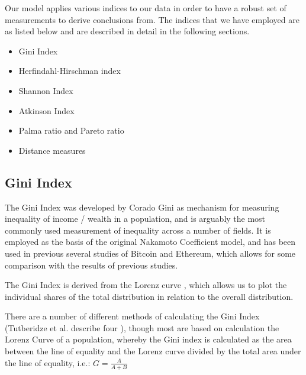 \documentclass[conference]{IEEEtran}
\begin{document}
Our model applies various indices to our data in order to have a robust set of measurements to derive conclusions from.  The indices that we have employed are as listed below and are described in detail in the following sections.

\begin{itemize}
    \item Gini Index
    \item Herfindahl-Hirschman index
    \item Shannon Index
    \item Atkinson Index
    \item Palma ratio and Pareto ratio
    \item Distance measures
\end{itemize}

\subsection{Gini Index}

The Gini Index was developed by Corado Gini \cite{gini1936measure} as mechanism for measuring inequality of income / wealth in a population, and is arguably the most commonly used measurement of inequality across a number of fields.   It is employed as the basis of the original Nakamoto Coefficient model, and has been used in previous \cite{sai2021characterizing, lee2021dq, gupta2018gini, kusmierz2022centralized, kwon2019impossibility, cong2023inclusion, gochhayat2020measuring, karakostas2022sok, zhang2022sok, campajola2022evolution} several studies of Bitcoin and Ethereum, which allows for some comparison with the results of previous studies.

The Gini Index is derived from the Lorenz curve \cite{lorenz1905methods}, which allows us to plot the individual shares of the total distribution in relation to the overall distribution.

There are a number of different methods of calculating the Gini Index (Tutberidze et al. describe four \cite{tutberidze2018measuring}), though most are based on calculation the Lorenz Curve of a population, whereby the  Gini index is calculated as the area between the line of equality and the Lorenz curve divided by the total area under the line of equality, i.e.: \(G=\frac{A}{A+B}\)

\end{document}
